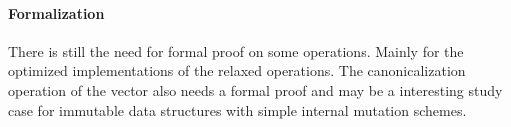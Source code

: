 \paragraph{Formalization}
There is still the need for formal proof on some operations. Mainly for the optimized implementations of the relaxed operations. The canonicalization operation of the vector also needs a formal proof and may be a interesting study case for immutable data structures with simple internal mutation schemes.


